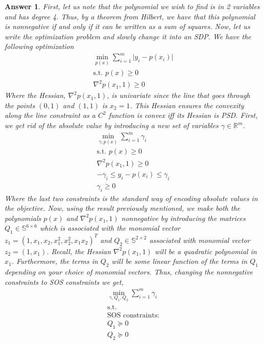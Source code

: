\documentclass[12pt]{article}
\theoremstyle{colon}
\newtheorem*{answer}{Answer}
\begin{document}
\begin{answer}
  First, let us note that the polynomial we wish to find is in 2 variables and has degree 4. Thus, by a theorem from Hilbert, we have that this polynomial is nonnegative if and only if it can be written as a sum of squares. Now, let us write the optimization problem and slowly change it into an SDP. We have the following optimization
  \begin{gather*}
    \min_{p(x)} \sum_{i = 1}^m \lvert y_i - p(x_i) \rvert \\
    \text{s.t. } p(x) \geq 0 \\
    \nabla^2 p(x_1,1) \geq 0
  \end{gather*}
  Where the Hessian, $\nabla^2 p(x_1,1)$, is univariate since the line that goes through the points $(0,1)$ and $(1,1)$ is $x_2 = 1$. This Hessian ensures the convexity along the line constraint as a $C^2$ function is convex iff its Hessian is PSD. First, we get rid of the absolute value by introducing a new set of variables $\gamma \in \mathbb{R}^m$.
  \begin{gather*}
    \min_{\gamma, p(x)} \sum_{i=1}^m \gamma_i \\
    \text{s.t. } p(x) \geq 0 \\
    \nabla^2 p(x_1,1) \geq 0 \\
    -\gamma_i \leq y_i - p(x_i) \leq \gamma_i \\
    \gamma_i \geq 0
  \end{gather*}
  Where the last two constraints is the standard way of encoding absolute values in the objective. Now, using the result previously mentioned, we make both the polynomials $p(x)$ and $\nabla^2 p(x_1,1)$ nonnegative by introducing the matrices $Q_1 \in \mathbb{S}^{6 \times 6}$ which is associated with the monomial vector $z_1 = (1, x_1, x_2, x_1^2, x_2^2, x_1 x_2)^T$ and $Q_2 \in \mathbb{S}^{2 \times 2}$ associated with monomial vector $z_2 = (1, x_1)$. Recall, the Hessian $\nabla^2 p(x_1,1)$ will be a quadratic polynomial in $x_1$. Furthermore, the terms in $Q_2$ will be some linear function of the terms in $Q_1$ depending on your choice of monomial vectors. Thus, changing the nonnegative constraints to SOS constraints we get,
  \begin{gather*}
    \min_{\gamma, Q_1, Q_2} \sum_{i=1}^m \gamma_i \\
    \text{s.t. } \\
    \text{SOS constraints:} \\
    Q_1 \succeq 0 \\
    Q_2 \succeq 0 \\

\end{gather*}
\end{answer}
\end{document}
